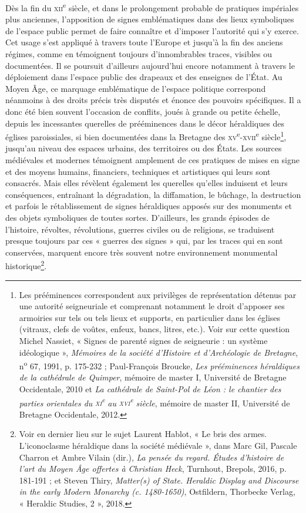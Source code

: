 \documentclass[12pt,twoside,openany]{book}
\begin{document}
Dès la fin du \textsc{xii}\textsuperscript{e} siècle, et dans le prolongement probable de pratiques impériales plus anciennes, l’apposition de signes emblématiques dans des lieux symboliques de l’espace public permet de faire connaître et d’imposer l’autorité qui s’y exerce. Cet usage s’est appliqué à travers toute l’Europe et jusqu’à la fin des anciens régimes, comme en témoignent toujours d’innombrables traces, visibles ou documentées. Il se poursuit d’ailleurs aujourd’hui encore notamment à travers le déploiement dans l’espace public des drapeaux et des enseignes de l’État. Au Moyen Âge, ce marquage emblématique de l’espace politique correspond néanmoins à des droits précis très disputés et énonce des pouvoirs spécifiques. Il a donc été bien souvent l’occasion de conflits, joués à grande ou petite échelle, depuis les incessantes querelles de prééminences dans le décor héraldiques des églises paroissiales, si bien documentées dans la Bretagne des \textsc{xv}\textsuperscript{e}-\textsc{xvii}\textsuperscript{e} siècle\footnote{Les prééminences correspondent aux privilèges de représentation détenus par une autorité seigneuriale et comprenant notamment le droit d’apposer ses armoiries sur tels ou tels lieux et supports, en particulier dans les églises (vitraux, clefs de voûtes, enfeux, bancs, litres, etc.). Voir sur cette question Michel Nassiet, « Signes de parenté signes de seigneurie : un système idéologique », \textit{Mémoires de la société d’Histoire et d’Archéologie de Bretagne}, n\textsuperscript{o} 67, 1991, p. 175-232 ; Paul-François Broucke, \textit{Les prééminences héraldiques de la cathédrale de Quimper}, mémoire de master I, Université de Bretagne Occidentale, 2010 et \textit{La cathédrale de Saint-Pol de Léon : le chantier des parties orientales du }\textit{\textsc{xi}}\textit{\textsuperscript{e}}\textit{ au }\textit{\textsc{xvi}}\textit{\textsuperscript{e}}\textit{ siècle}, mémoire de master II, Université de Bretagne Occidentale, 2012.}, jusqu’au niveau des espaces urbains, des territoires ou des États. Les sources médiévales et modernes témoignent amplement de ces pratiques de mises en signe et des moyens humains, financiers, techniques et artistiques qui leurs sont consacrés. Mais elles révèlent également les querelles qu’elles induisent et leurs conséquences, entraînant la dégradation, la diffamation, le bûchage, la destruction et parfois le rétablissement de signes héraldiques apposés sur des monuments et des objets symboliques de toutes sortes. D’ailleurs, les grands épisodes de l’histoire, révoltes, révolutions, guerres civiles ou de religions, se traduisent presque toujours par ces « guerres des signes » qui, par les traces qui en sont conservées, marquent encore très souvent notre environnement monumental historique\footnote{Voir en dernier lieu sur le sujet Laurent Hablot, « Le bris des armes. L’iconoclasme héraldique dans la société médiévale », dans Marc Gil, Pascale Charron et Ambre Vilain (dir.), \textit{La pensée du regard. Études d’histoire de l’art du Moyen Âge offertes à Christian Heck}, Turnhout, Brepols, 2016, p. 181-191 ; et Steven Thiry, \textit{Matter(s) of State. Heraldic Display and Discourse in the early Modern Monarchy (c. 1480-1650)}, Ostfildern, Thorbecke Verlag, « Heraldic Studies, 2 », 2018.}.
\end{document}

